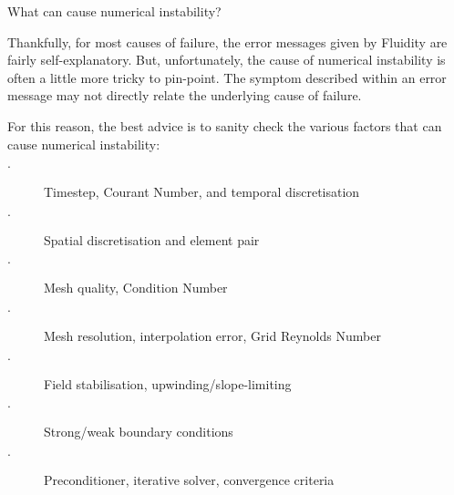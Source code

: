 \documentclass[professionalfonts, 8pt]{beamer}
\begin{document}

\begin{frame}{What can cause numerical instability?}

Thankfully, for most causes of failure, the error messages given by Fluidity are fairly self-explanatory.
But, unfortunately, the cause of numerical instability is often a little more tricky to pin-point.
The symptom described within an error message may not directly relate the underlying cause of failure.

\vspace{1ex}
For this reason, the best advice is to sanity check the various factors that can cause numerical instability:
\begin{description}
 \item[$\cdot$] Timestep, Courant Number, and temporal discretisation
 \item[$\cdot$] Spatial discretisation and element pair
 \item[$\cdot$] Mesh quality, Condition Number
 \item[$\cdot$] Mesh resolution, interpolation error, Grid Reynolds Number
 \item[$\cdot$] Field stabilisation, upwinding/slope-limiting
 \item[$\cdot$] Strong/weak boundary conditions
 \item[$\cdot$] Preconditioner, iterative solver, convergence criteria
\end{description}

\end{frame}

\end{document}
